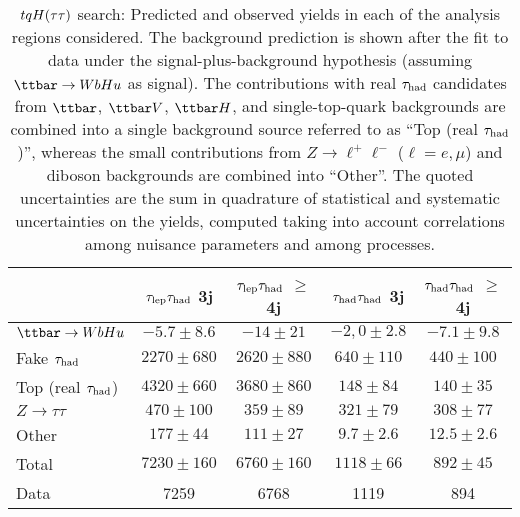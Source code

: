 \begin{table}[htbp]
\small
\begin{center}
\begin{tabular}{l*{4}{c}}
\hline\hline
 & $\tau_{\mathrm{lep}} \tau_{\mathrm{had}}$ 3j & $\tau_{\mathrm{lep}} \tau_{\mathrm{had}}$ $\geq$4j & $\tau_{\mathrm{had}} \tau_{\mathrm{had}}$ 3j &  $\tau_{\mathrm{had}} \tau_{\mathrm{had}}$ $\geq$4j \\
\hline
$\Hu$  &   $ -5.7 \pm 8.6 $ &   $ -14 \pm 21 $ &   $ -2,0 \pm 2.8 $ &   $ -7.1 \pm 9.8 $ \\ 
\hline
Fake $\tau_{\mathrm{had}}$  &   $ 2270 \pm 680 $ &   $ 2620 \pm 880 $ &   $ 640 \pm 110 $ &   $ 440 \pm 100 $ \\
Top (real $\tau_{\mathrm{had}}$)  &   $ 4320 \pm 660 $ &   $ 3680 \pm 860 $ &   $ 148 \pm 84 $ &   $ 140 \pm 35 $ \\ 
$Z \to \tau\tau$  &   $ 470 \pm 100 $ &   $ 359 \pm 89 $ &   $ 321 \pm 79 $ &   $ 308 \pm 77 $ \\ 
Other  &   $ 177 \pm 44 $ &   $ 111 \pm 27 $ &   $ 9.7 \pm 2.6 $ &   $ 12.5 \pm 2.6 $ \\ 
\hline
Total  &   $ 7230 \pm 160 $ &   $ 6760 \pm 160 $ &   $ 1118 \pm 66 $ &   $ 892 \pm 45 $ \\ 
\hline
Data  & 7259  & 6768  & 1119  & 894  \\ 
\hline\hline    
\end{tabular}

%
\end{center}
\caption{
$tqH(\tau\tau)$ search: Predicted and observed yields in each of the analysis regions considered.
The background prediction is shown after the fit to data under the signal-plus-background hypothesis 
(assuming $\Hu$ as signal).
The contributions with real $\tau_{\mathrm{had}}$ candidates from $\ttbar$,  $\ttbar V$, $\ttbar H$, and single-top-quark backgrounds are combined into
a single background source referred to as ``Top (real $\tau_{\mathrm{had}}$)'', whereas the small contributions from 
$Z\to \ell^+\ell^-$ ($\ell = e, \mu$) and diboson backgrounds are combined into ``Other''. 
The quoted uncertainties are the sum in quadrature of statistical and systematic uncertainties on the yields, 
computed taking into account correlations among nuisance parameters and among processes.
}
\label{tab:Htautau_Postfit_Yields_Unblind_Hu}
\end{table} 
